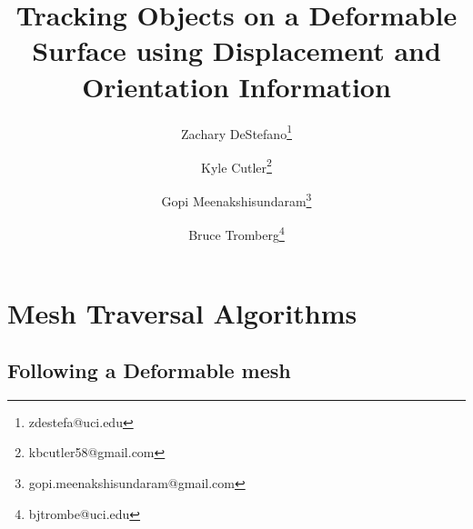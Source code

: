\documentclass[conference]{acmsiggraph}
\title{Tracking Objects on a Deformable Surface using Displacement and Orientation Information}
\author[1]{Zachary DeStefano\thanks{zdestefa@uci.edu}}
\author[1]{Kyle Cutler\thanks{kbcutler58@gmail.com}}
\author[1]{Gopi Meenakshisundaram\thanks{gopi.meenakshisundaram@gmail.com}}
\author[1]{Bruce Tromberg\thanks{bjtrombe@uci.edu}}
\affil[1]{University of California, Irvine}
\begin{document}

\maketitle



\section{Mesh Traversal Algorithms}

\subsection{Following a Deformable mesh}
\end{document}
